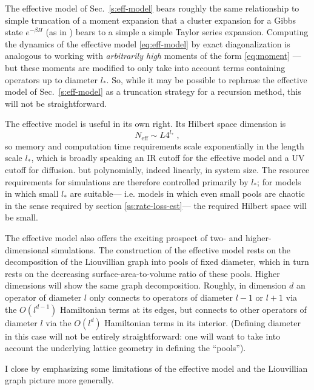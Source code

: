 \documentclass[aps,prb,nofootinbib,twocolumn,balancelastpage,amsmath,amssymb,floatfix,superscriptaddress,]{revtex4-1}
\begin{document}
  The effective model of Sec.~\ref{s:eff-model} bears roughly the same relationship to simple truncation of a moment expansion
  that a cluster expansion for a Gibbs state $e^{-\beta H}$
  (as in )
  bears to a simple a simple Taylor series expansion.
  Computing the dynamics of the effective model \eqref{eq:eff-model} by exact diagonalization is analogous to working with \textit{arbitrarily high} moments of the form \eqref{eq:moment}%
  ---but these moments are modified to only take into account terms containing operators up to diameter $l_*$.
  So, while it may be possible to rephrase the effective model of Sec.~\ref{s:eff-model} as a truncation strategy for a recursion method,
  this will not be straightforward.


The effective model is useful in its own right.
Its Hilbert space dimension is
\begin{equation}
  N_{\mathrm{eff}} \sim L 4^{l_*}\;,
\end{equation}
so memory and computation time requirements
scale exponentially in the length scale $l_*$,
 which is broadly speaking an IR cutoff for the effective model and a UV cutoff for diffusion.
but polynomially, indeed linearly, in system size.
The resource requirements for simulations are therefore controlled primarily by $l_*$;
for models in which small $l_*$ are suitable---%
i.e. models in which even small pools are chaotic in the sense required by section \ref{ss:rate-loss-est}---%
the required Hilbert space will be small.

The effective model also offers the exciting prospect of two- and higher-dimensional simulations.
The construction of the effective model rests on the decomposition of the Liouvillian graph into pools of fixed diameter,
which in turn rests on the decreasing surface-area-to-volume ratio of these pools.
Higher dimensions will show the same graph decomposition.
Roughly, in dimension $d$
an operator of diameter $l$
only connects to operators of diameter $l-1$ or $l+1$
via the $O(l^{d-1})$ Hamiltonian terms at its edges,
but connects to other operators of diameter $l$ via the $O(l^d)$ Hamiltonian terms in its interior.
(Defining diameter in this case will not be entirely straightforward:
one will want to take into account the underlying lattice geometry in defining the ``pools'').


I close by emphasizing some limitations of the effective model and the Liouvillian graph picture more generally.
\end{document}
